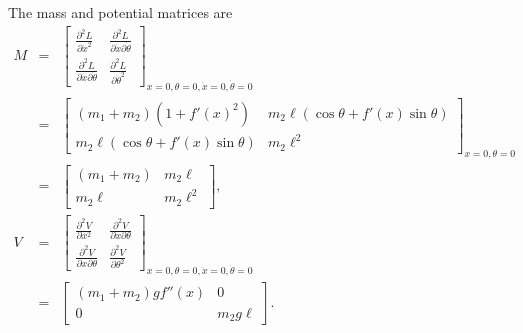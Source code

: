 \documentclass[letterpaper,11pt]{article}
\begin{document}
The mass and potential matrices are
\begin{eqnarray*}
 M & = & \left[ \begin{array}{cc}
          \frac{\partial^2 L}{\partial \dot{x}^2} & \frac{\partial^2 L}{\partial \dot{x} \partial \dot{\theta}} \\
          \frac{\partial^2 L}{\partial \dot{x} \partial \dot{\theta}} & \frac{\partial^2 L}{\partial \dot{\theta}^2}
         \end{array} \right]_{x=0,\theta=0,\dot{x}=0,\dot{\theta}=0} \\
   & = & \left[ \begin{array}{cc}
          (m_1 + m_2) (1 + f'(x)^2) & m_2 \ell (\cos\theta + f'(x) \sin\theta) \\
           m_2 \ell (\cos\theta + f'(x) \sin\theta) & m_2 \ell^2
         \end{array} \right]_{x=0,\theta=0} \\
   & = & \left[ \begin{array}{cc}
          (m_1 + m_2) & m_2 \ell \\
           m_2 \ell & m_2 \ell^2
         \end{array} \right], \\
 V & = & \left[ \begin{array}{cc}
          \frac{\partial^2 V}{\partial x^2} & \frac{\partial^2 V}{\partial x \partial \theta} \\
          \frac{\partial^2 V}{\partial x \partial \theta} & \frac{\partial^2 V}{\partial \theta^2}
         \end{array} \right]_{x=0,\theta=0,\dot{x}=0,\dot{\theta}=0} \\
   & = & \left[ \begin{array}{cc}
          (m_1 + m_2) g f''(x) & 0 \\
          0 & m_2 g \ell
         \end{array} \right].
\end{eqnarray*}
\end{document}

